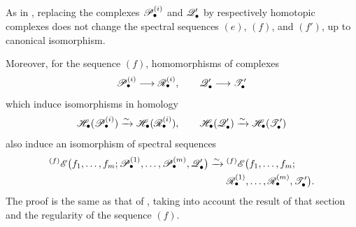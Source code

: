 \begin{remark}[6.9.5]
\label{III.6.9.5}
As in , replacing the complexes
$\mathscr{P}_\bullet^{(i)}$ and $\mathscr{Q}_\bullet'$ by respectively
homotopic complexes does not change the spectral sequences $(e)$,
$(f)$, and $(f')$, up to canonical isomorphism.

Moreover, for the sequence $(f)$, homomorphisms of complexes
\[
  \mathscr{P}_\bullet^{(i)}\longrightarrow\mathscr{R}_\bullet^{(i)},
  \qquad
  \mathscr{Q}_\bullet'\longrightarrow\mathscr{T}_\bullet'
\]
which induce isomorphisms in homology
\[
  \mathscr{H}_\bullet(\mathscr{P}_\bullet^{(i)})
  \xrightarrow{\sim}
  \mathscr{H}_\bullet(\mathscr{R}_\bullet^{(i)}),
  \qquad
  \mathscr{H}_\bullet(\mathscr{Q}_\bullet')
  \xrightarrow{\sim}
  \mathscr{H}_\bullet(\mathscr{T}_\bullet')
\]
also induce an isomorphism of spectral sequences
\[
\begin{split}
  {}^{(f)}\mathscr{E}
  \bigl(
    f_1,\ldots,f_m;
    \mathscr{P}_\bullet^{(1)},\ldots,\mathscr{P}_\bullet^{(m)},
    \mathscr{Q}_\bullet'
  \bigr)
  \xrightarrow{\sim}\;&
  {}^{(f)}\mathscr{E}
  \bigl(
    f_1,\ldots,f_m;
    \\
    &
    \mathscr{R}_\bullet^{(1)},\ldots,\mathscr{R}_\bullet^{(m)},
    \mathscr{T}_\bullet'
  \bigr).
\end{split}
\]
The proof is the same as that of , taking into
account the result of that section and the regularity of the
sequence $(f)$.
\end{remark}

